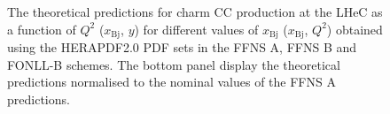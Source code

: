 \documentclass[pdftex,twocolumn,epjc3]{svjour3}          %
\newcommand{\xbj}{\ensuremath{x_{\text{Bj}}}\xspace}
\newcommand{\fonll} {{FONLL-B}\xspace}
\newcommand{\ffns} {{FFNS A}\xspace}
\newcommand{\ffnsb} {{FFNS B}\xspace}
\begin{document}
{\begin{figure}
    \centering
    \caption{The theoretical predictions for charm CC production at the LHeC as a function of $Q^2$ ($\xbj$, $y$) for different values of $\xbj$ ($\xbj$, $Q^2$) obtained using the HERAPDF2.0 PDF sets in the \ffns, \ffnsb and \fonll schemes. The bottom panel display the theoretical predictions normalised to the nominal values of the \ffns predictions.}
    \label{fig:thpred-ff3abfonll}
\end{figure}
}
\end{document}

